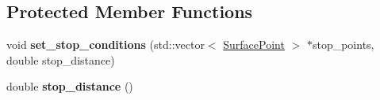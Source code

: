 \subsection*{Protected Member Functions}
\begin{DoxyCompactItemize}
\item 
\hypertarget{classgeodesic_1_1_geodesic_algorithm_base_a4f2040a2d68593a6c8792d46202bc5e6}{}void {\bfseries set\+\_\+stop\+\_\+conditions} (std\+::vector$<$ \hyperlink{classgeodesic_1_1_surface_point}{Surface\+Point} $>$ $\ast$stop\+\_\+points, double stop\+\_\+distance)\label{classgeodesic_1_1_geodesic_algorithm_base_a4f2040a2d68593a6c8792d46202bc5e6}

\item 
\hypertarget{classgeodesic_1_1_geodesic_algorithm_base_a0bb83e25e4ef90d92f6d79b783efd909}{}double {\bfseries stop\+\_\+distance} ()\label{classgeodesic_1_1_geodesic_algorithm_base_a0bb83e25e4ef90d92f6d79b783efd909}

\end{DoxyCompactItemize}
